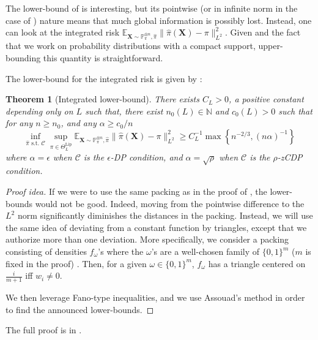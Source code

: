 \documentclass[10pt]{article} %
\newtheorem{theorem}{Theorem}
\newcommand{\N}[0]{\mathbb{N}}
\newcommand{\Prob}[0]{\mathbb{P}}
\newcommand{\E}[0]{\mathbb{E}}
\newcommand\vect[1]{\mathbf{#1}}
\newcommand\AG[1]{\textcolor{magenta}{#1}}
\begin{document}
The lower-bound of  is interesting, but its pointwise (or in infinite norm in the case of ) nature means that much global information is possibly lost. 
Instead,
one can look at the integrated risk $\E_{\vect{X} \sim \Prob_{\pi}^{\otimes n}, \hat{\pi}}\|\hat{\pi}(\vect{X})- \pi\|_{L^2}^2$. Given  and the fact that we work on probability distributions with a compact support, upper-bounding this quantity is straightforward.

The lower-bound for the integrated risk is given by :

\begin{theorem}[Integrated lower-bound]
\label{th:lidp}
There exists $C_L>0$, a positive constant depending only on $L$ such that, there exist $n_0(L) \in \N$ and $c_0(L) > 0$ such that for any $n \geq n_0$, and any $\alpha \geq c_0/n$
\begin{equation*}
    \inf_{\hat{\pi} \text{ s.t. } \mathcal{C}} \sup_{\pi \in \Theta^{\text{Lip}}_L}
    \E_{\vect{X} \sim \Prob_{\pi}^{\otimes n}, \hat{\pi}}\|\hat{\pi}(\vect{X})- \pi\|_{L^2}^2 \geq C_L^{-1} \max \left\{ n^{-2/3}, (n \alpha)^{-1} \right\}
\end{equation*}
where $\alpha=\epsilon$
when $\mathcal{C}$ is the $\epsilon$-DP condition, and 
$\alpha=\sqrt{\rho}$ when $\mathcal{C}$ is the $\rho$-zCDP condition.
\end{theorem}

\begin{proof}[Proof idea]
If we were to use the same packing %
as in the proof of , the lower-bounds would not be good. Indeed, moving from the pointwise difference to the $L^2$ norm significantly diminishes the distances in the packing. Instead, we will use %
the same idea of deviating from a constant function by triangles, except that we authorize more than one deviation. More specifically, we consider a packing consisting of densities $f_{\omega}$'s where the $\omega$'s are a well-chosen family of $\{ 0, 1 \}^m$ ($m$ is fixed in the proof) \citep{van2000asymptotic}. Then, for a given  $\omega \in \{ 0, 1 \}^m$, $f_{\omega}$ has a triangle centered on $\frac{i}{m+1}$ iff $w_i \neq 0$. %

We then leverage Fano-type inequalities, and we use Assouad's method in order to find the announced lower-bounds.
\end{proof}
The full proof is in .
\end{document}
